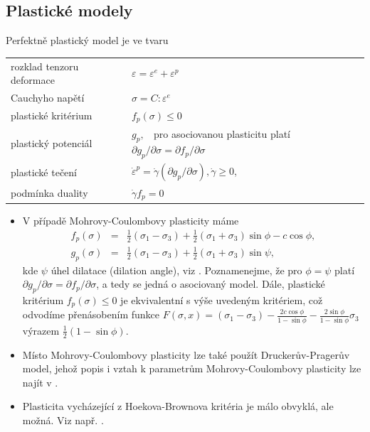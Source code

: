 \documentclass{article}
\newcommand{\alert}[1]{{\color{red}#1}}
\begin{document}
\subsection{Plastické modely}
\alert{Perfektně} plastický model je ve tvaru
\begin{table}[ht]
	\centering
	\begin{tabular}{ll}
		\hline
		rozklad tenzoru deformace & $\varepsilon = \varepsilon^e + \varepsilon^p$\\
		Cauchyho napětí & $\sigma = C : \varepsilon^e$\\
		\alert{plastické kritérium} & \alert{$f_p(\sigma)\leq0$}\\
		plastický potenciál & $g_p,\;\;$ \alert{pro asociovanou plasticitu platí} $\partial g_p/\partial \sigma = \partial f_p/\partial \sigma$  \\
		plastické tečení & \alert{$\dot{\varepsilon}^p = \dot{\gamma}(\partial g_p/\partial \sigma), \dot\gamma \geq 0$,}\\
		podmínka duality & $\dot{\gamma} f_p =0$\\
		\hline
	\end{tabular}
\end{table}

\begin{itemize}
	\item V případě Mohrovy-Coulombovy plasticity máme
	\begin{eqnarray*}
		f_p(\sigma) &=& \frac{1}{2} (\sigma_1 - \sigma_3) + \frac{1}{2} (\sigma_1 + \sigma_3)\sin \phi - c \cos \phi, \\
		g_p(\sigma) &=& \frac{1}{2} (\sigma_1 - \sigma_3) + \frac{1}{2} (\sigma_1 + \sigma_3)\sin \psi,
	\end{eqnarray*}
	\alert{kde $\psi$ úhel dilatace (dilation angle), viz \cite{Neto2011}. Poznamenejme, že pro $\phi = \psi$ platí $\partial g_p/\partial \sigma = \partial f_p/\partial \sigma$, a tedy se jedná o asociovaný model. Dále, plastické kritérium $f_p(\sigma)\leq0$ je ekvivalentní s výše uvedeným kritériem, což odvodíme přenásobením funkce
	$F(\sigma, x) = (\sigma_1 - \sigma_3) - \frac{2c\cos \phi}{1-\sin \phi} - \frac{2\sin \phi}{1-\sin \phi} \sigma_3$ výrazem $\frac{1}{2}(1 - \sin \phi)$.}
	\item Místo Mohrovy-Coulombovy plasticity lze také použít Druckerův-Pragerův model, jehož popis i vztah k parametrům Mohrovy-Coulombovy plasticity lze najít v \cite{Neto2011}. 
	\item Plasticita vycházející z Hoekova-Brownova kritéria je málo obvyklá, ale možná. Viz např. \cite{Carranza-Torres1999}.
\end{itemize}
\end{document}
